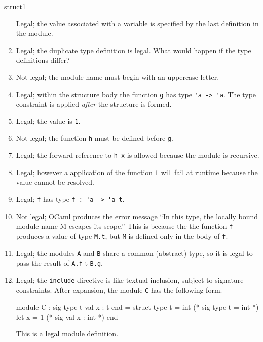 \begin{exercise}{struct1}
\begin{answer}
\begin{enumerate}
Legal; the value associated with a variable is specified by the last
definition in the module.
\item 

Legal; the duplicate type definition is legal.  What would happen if
the type definitions differ?
\item 

Not legal; the module name must begin with an uppercase letter.
\item 

Legal; within the structure body the function \hbox{\lstinline/g/} has
type \hbox{\lstinline$'a -> 'a$}.  The type constraint is
applied \emph{after} the structure is formed.
\item 

Legal; the value is \hbox{\lstinline$1$}.
\item 

Not legal; the function \hbox{\lstinline/h/} must be defined before \hbox{\lstinline/g/}.
\item 

Legal; the forward reference to \hbox{\lstinline$h x$} is allowed
because the module is recursive.
\item 

Legal; however a application of the function \hbox{\lstinline/f/} will fail at
runtime because the value cannot be resolved.
\item 

Legal; \hbox{\lstinline/f/} has type \hbox{\lstinline$f : 'a -> 'a t$}.
\item

Not legal; OCaml produces the error message ``In this type, the
locally bound module name M escapes its scope.''  This is because the
the function \hbox{\lstinline/f/} produces a value of type \hbox{\lstinline$M.t$},
but \hbox{\lstinline$M$} is defined only in the body of \hbox{\lstinline/f/}.

\item

Legal; the modules \hbox{\lstinline/A/} and \hbox{\lstinline/B/} share a common (abstract) type,
so it is legal to pass the result of \lstinline $A.f$
t \hbox{\lstinline$B.g$}.

\item

Legal; the \hbox{\lstinline$include$} directive is like textual inclusion,
subject to signature constraints.  After expansion, the module \hbox{\lstinline/C/}
has the following form.

\begin{ocaml}
module C : sig
   type t
   val x : t
end = struct
   type t = int (* sig type t = int *)
   let x = 1    (* sig val x : int *)
end
\end{ocaml}
%
This is a legal module definition.
\end{enumerate}
\fi\end{answer}
\end{exercise}

